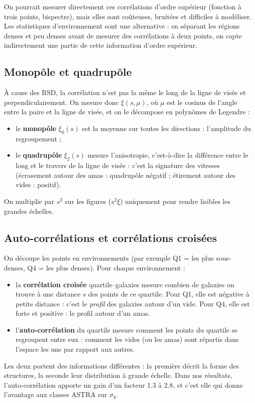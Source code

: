 \documentclass[11pt]{article}
\begin{document}
On pourrait mesurer directement ces corrélations d'ordre supérieur (fonction à trois points, bispectre), mais elles sont coûteuses, bruitées et difficiles à modéliser. Les statistiques d'environnement sont une alternative : en séparant les régions denses et peu denses avant de mesurer des corrélations à deux points, on capte indirectement une partie de cette information d'ordre supérieur.

\subsection{Monopôle et quadrupôle}
À cause des RSD, la corrélation n'est pas la même le long de la ligne de visée et perpendiculairement. On mesure donc $\xi(s,\mu)$, où $\mu$ est le cosinus de l'angle entre la paire et la ligne de visée, et on le décompose en polynômes de Legendre :
\begin{itemize}
\item le \textbf{monopôle} $\xi_0(s)$ est la moyenne sur toutes les directions : l'amplitude du regroupement ;
\item le \textbf{quadrupôle} $\xi_2(s)$ mesure l'anisotropie, c'est-à-dire la différence entre le long et le travers de la ligne de visée : c'est la signature des vitesses (écrasement autour des amas : quadrupôle négatif ; étirement autour des vides : positif).
\end{itemize}
On multiplie par $s^2$ sur les figures ($s^2\xi$) uniquement pour rendre lisibles les grandes échelles.

\subsection{Auto-corrélations et corrélations croisées}
On découpe les points en environnements (par exemple Q1 = les plus sous-denses, Q4 = les plus denses). Pour chaque environnement :
\begin{itemize}
\item la \textbf{corrélation croisée} quartile--galaxies mesure combien de galaxies on trouve à une distance $s$ des points de ce quartile. Pour Q1, elle est négative à petite distance : c'est le \emph{profil} des galaxies autour d'un vide. Pour Q4, elle est forte et positive : le profil autour d'un amas.
\item l'\textbf{auto-corrélation} du quartile mesure comment les points du quartile se regroupent entre eux : comment les vides (ou les amas) sont répartis dans l'espace les uns par rapport aux autres.
\end{itemize}
Les deux portent des informations différentes : la première décrit la forme des structures, la seconde leur distribution à grande échelle. Dans nos résultats, l'auto-corrélation apporte un gain d'un facteur 1.3 à 2.8, et c'est elle qui donne l'avantage aux classes ASTRA sur $\sigma_8$.
\end{document}
